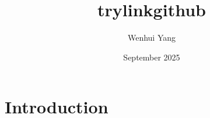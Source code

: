 \documentclass{article}
\title{trylinkgithub}
\author{Wenhui Yang}
\date{September 2025}
\begin{document}
\maketitle

\section{Introduction}
\end{document}
